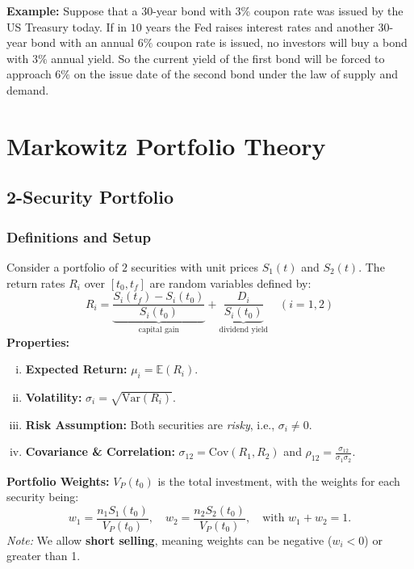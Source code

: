 \textbf{Example: } Suppose that a \(30\)-year bond with \(3\%\) coupon rate was issued by the US Treasury today. If in \(10\) years the Fed raises interest rates and another \(30\)-year bond with an annual \(6\%\) coupon rate is issued, no investors will buy a bond with \(3\%\) annual yield. So the current yield of the first bond will be forced to approach \(6\%\) on the issue date of the second bond under the law of supply and demand.

\section{Markowitz Portfolio Theory}
\subsection{2-Security Portfolio}

\subsubsection{Definitions and Setup}
Consider a portfolio of $2$ securities with unit prices $S_1(t)$ and $S_2(t)$. The return rates $R_i$ over $[t_0, t_f]$ are random variables defined by:
\begin{equation*}
    R_i = \underbrace{\frac{S_i(t_f) - S_i(t_0)}{S_i(t_0)}}_{\text{capital gain}} + \underbrace{\frac{D_i}{S_i(t_0)}}_{\text{dividend yield}} \quad (i = 1, 2)
\end{equation*}
\textbf{Properties:}
\begin{enumerate}[i.]
    \item \textbf{Expected Return:} $\mu_i = \mathbb{E}(R_i)$.
    \item \textbf{Volatility:} $\sigma_i = \sqrt{\text{Var}(R_i)}$.
    \item \textbf{Risk Assumption:} Both securities are \textit{risky}, i.e., $\sigma_i \neq 0$.
    \item \textbf{Covariance \& Correlation:} $\sigma_{12} = \text{Cov}(R_1, R_2)$ and $\rho_{12} = \frac{\sigma_{12}}{\sigma_1 \sigma_2}$.
\end{enumerate}
\textbf{Portfolio Weights:}
$V_P(t_0)$ is the total investment, with the weights for each security being:
\begin{equation*}
    w_1 = \frac{n_1S_1(t_0)}{V_P(t_0)}, \quad w_2 = \frac{n_2S_2(t_0)}{V_P(t_0)}, \quad \text{with } w_1 + w_2 = 1.
\end{equation*}
\textit{Note:} We allow \textbf{short selling}, meaning weights can be negative ($w_i < 0$) or greater than 1.


